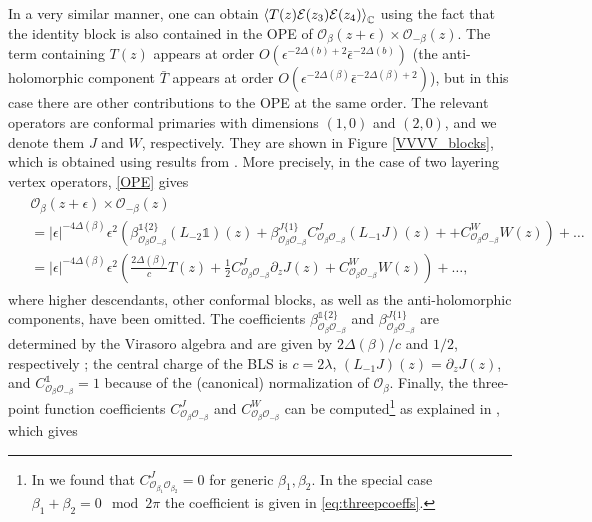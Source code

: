 \documentclass[a4paper,11pt]{article}
\begin{document}
In a very similar manner, one can obtain $\Braket{T(z) \mathcal{E}(z_3) \mathcal{E}(z_4)}_\mathbb{C}$ using the fact that the identity block is also contained in the OPE of $\mathcal{O}_{\beta}(z+\epsilon) \times \mathcal{O}_{-\beta}(z)$. The term containing $T(z)$ appears at order $O(\epsilon^{-2 \Delta(b) + 2} \bar{\epsilon}^{-2 \Delta(b)})$ (the anti-holomorphic component $\bar{T}$ appears at order $O(\epsilon^{-2 \Delta(\beta)} \bar{\epsilon}^{-2 \Delta(\beta)+2})$), but in this case there are other contributions to the OPE at the same order. The relevant operators are conformal primaries with dimensions $(1,0)$ and $(2,0)$, and we denote them $J$ and $W$, respectively. They are shown in Figure \ref{VVVV_blocks}, which is obtained using results from \cite{Camia_2020}. More precisely, in the case of two layering vertex operators, \eqref{OPE} gives
\begin{align}
\begin{split} \label{OPEapplied}
    &\mathcal{O}_\beta(z+\epsilon) \times \mathcal{O}_{-\beta}(z) \\
    &= |\epsilon|^{-4\Delta(\beta)} \epsilon^2 \left( \beta_{\mathcal{O}_\beta \mathcal{O}_{-\beta}}^{\mathbb{1} \{2\}} (L_{-2} \mathbb{1})(z) + \beta_{\mathcal{O}_\beta \mathcal{O}_{-\beta}}^{J\{1\}} C_{\mathcal{O}_\beta \mathcal{O}_{-\beta}}^J (L_{-1} J)(z) + + C_{\mathcal{O}_\beta \mathcal{O}_{-\beta}}^W W(z) \right) + \ldots \\
    &= |\epsilon|^{-4\Delta(\beta)} \epsilon^2 \left(
    \frac{2 \Delta(\beta)}{c}T(z) + \frac{1}{2} C_{\mathcal{O}_\beta \mathcal{O}_{-\beta}}^J \partial_z J(z) + C_{\mathcal{O}_\beta \mathcal{O}_{-\beta}}^W W(z)
    \right) + \ldots,
\end{split}
\end{align}
where higher descendants, other conformal blocks, as well as the anti-holomorphic components, have been omitted. The coefficients $\beta_{\mathcal{O}_\beta \mathcal{O}_{-\beta}}^{\mathbb{1} \{2\}}$ and $\beta_{\mathcal{O}_\beta \mathcal{O}_{-\beta}}^{J\{1\}}$ are determined by the Virasoro algebra and are given by $2 \Delta(\beta) / c$ and $1/2$, respectively \cite{DiFrancesco:639405}; the central charge of the BLS is $c=2\lambda$, $(L_{-1} J)(z) = \partial_z J(z)$, and $C_{\mathcal{O}_\beta \mathcal{O}_{-\beta}}^{\mathbb{1}} = 1$ because of the (canonical) normalization of $\mathcal{O}_{\beta}$. Finally, the three-point function coefficients $C_{\mathcal{O}_\beta \mathcal{O}_{-\beta}}^{J}$ and $C_{\mathcal{O}_\beta \mathcal{O}_{-\beta}}^{W}$ can be computed\footnote{In \cite{Camia_2020} we found that $C_{\mathcal{O}_{\beta_1} \mathcal{O}_{\beta_2} }^J = 0$ for generic $\beta_1, \beta_2$. In the special case $\beta_1 + \beta_2 = 0 \mod 2 \pi$ the coefficient is given in \eqref{eq:threepcoeffs}.} as explained in \cite{Camia_2020}, which gives
\end{document}
